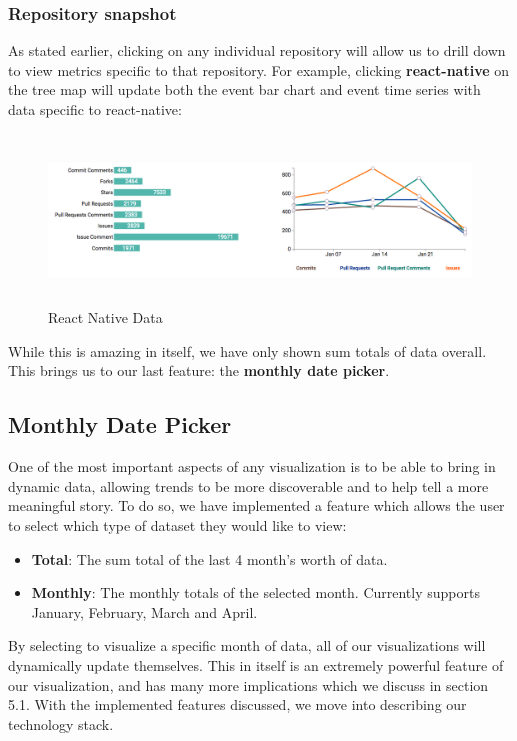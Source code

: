 \documentclass{article}
\begin{document}
\subsubsection {Repository snapshot}

As stated earlier, clicking on any individual repository will allow us to drill down to view metrics specific to that repository. For example, clicking \textbf{react-native} on the tree map will update both the event bar chart and event time series with data specific to react-native:

\begin{figure}[h!]
\centering
\includegraphics[height=4.5cm, width=17cm]{native}
\caption{React Native Data}
\end{figure}

While this is amazing in itself, we have only shown sum totals of data overall. This brings us to our last feature: the \textbf{monthly date picker}.

\subsection {Monthly Date Picker}

One of the most important aspects of any visualization is to be able to bring in dynamic data, allowing trends to be more discoverable and to help tell a more meaningful story. To do so, we have implemented a feature which allows the user to select which type of dataset they would like to view:

\begin {itemize}
	\item \textbf{Total}: The sum total of the last 4 month's worth of data.
	\item \textbf{Monthly}: The monthly totals of the selected month. Currently supports January, February, March and April.
\end {itemize}

By selecting to visualize a specific month of data, all of our visualizations will dynamically update themselves. This in itself is an extremely powerful feature of our visualization, and has many more implications which we discuss in section 5.1. With the implemented features discussed, we move into describing our technology stack.
\end{document}
